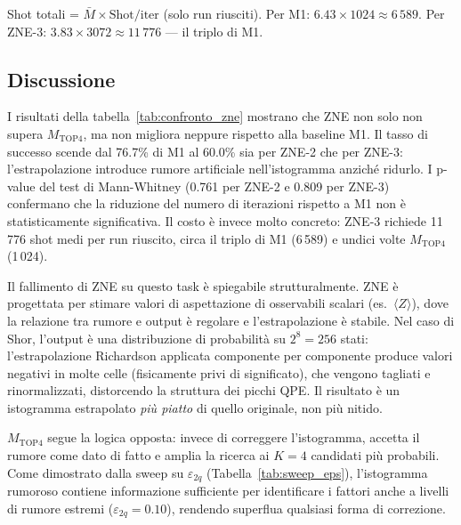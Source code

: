 \begin{onehalfspace}
\begin{table}[H]
\smallskip
{\footnotesize Shot totali = $\bar{M} \times \text{Shot/iter}$ (solo run riusciti). Per M1: $6.43 \times 1024 \approx 6\,589$. Per ZNE-3: $3.83 \times 3072 \approx 11\,776$ — il triplo di M1.}
\end{table}

\subsection{Discussione}

I risultati della tabella~\ref{tab:confronto_zne} mostrano che ZNE non solo non supera $M_{\text{TOP4}}$, ma non migliora neppure rispetto alla baseline M1. Il tasso di successo scende dal 76.7\% di M1 al 60.0\% sia per ZNE-2 che per ZNE-3: l'estrapolazione introduce rumore artificiale nell'istogramma anziché ridurlo. I p-value del test di Mann-Whitney (0.761 per ZNE-2 e 0.809 per ZNE-3) confermano che la riduzione del numero di iterazioni rispetto a M1 non è statisticamente significativa. Il costo è invece molto concreto: ZNE-3 richiede 11\,776 shot medi per run riuscito, circa il triplo di M1 (6\,589) e undici volte $M_{\text{TOP4}}$ (1\,024).

Il fallimento di ZNE su questo task è spiegabile strutturalmente. ZNE è progettata per stimare valori di aspettazione di osservabili scalari (es.\ $\langle Z \rangle$), dove la relazione tra rumore e output è regolare e l'estrapolazione è stabile. Nel caso di Shor, l'output è una distribuzione di probabilità su $2^8 = 256$ stati: l'estrapolazione Richardson applicata componente per componente produce valori negativi in molte celle (fisicamente privi di significato), che vengono tagliati e rinormalizzati, distorcendo la struttura dei picchi QPE. Il risultato è un istogramma estrapolato \emph{più piatto} di quello originale, non più nitido.

$M_{\text{TOP4}}$ segue la logica opposta: invece di correggere l'istogramma, accetta il rumore come dato di fatto e amplia la ricerca ai $K=4$ candidati più probabili. Come dimostrato dalla sweep su $\varepsilon_{2q}$ (Tabella~\ref{tab:sweep_eps}), l'istogramma rumoroso contiene informazione sufficiente per identificare i fattori anche a livelli di rumore estremi ($\varepsilon_{2q} = 0.10$), rendendo superflua qualsiasi forma di correzione.

\end{onehalfspace}
